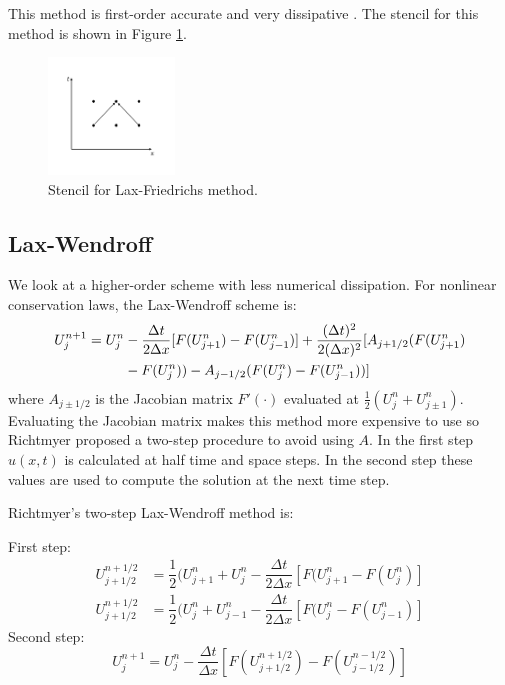 \documentclass[letterpaper]{article}
\newcommand{\Dt}{\Delta t}
\newcommand{\Dx}{\Delta x}
\begin{document}
This method is first-order accurate and very dissipative \cite{LeVequetext}. The stencil for this method is shown in Figure 
\ref{fig:stencil_laxfried}. \\

\begin{figure}[H]
\centering
\includegraphics[trim = 10mm 20mm 10mm 15mm, width=0.3\textwidth]{Laxfried.png}
\caption{Stencil for Lax-Friedrichs method.}
\label{fig:stencil_laxfried}
\end{figure}


\subsection{Lax-Wendroff}
We look at a higher-order scheme with less numerical dissipation. For nonlinear conservation laws, the Lax-Wendroff scheme is: 
\begin{align}
U^{n+1}_j = U^n_j &- \dfrac{\Dt}{2 \Dx}[F(U^n_{j+1}) - F(U^n_{j-1})] + \dfrac{(\Dt)^2}{2 (\Dx)^2}[A_{j+1/2}(F(U^n_{j+1}) \notag \\ 
&- F(U^n_j)) - A_{j-1/2}(F(U^n_j)- F(U^n_{j-1}))]
\end{align}
where $A_{j\pm 1/2}$ is the Jacobian matrix $F'(\cdot)$ evaluated at $\frac{1}{2}(U^n_j + U^n_{j\pm1})$. Evaluating the Jacobian matrix makes this method more expensive to use so Richtmyer proposed a two-step procedure to avoid using $A$. In the first step $u(x,t)$ is calculated at half time and space steps. In the second step these values are used to compute the solution at the next time step. 

Richtmyer's two-step Lax-Wendroff method is: 

First step:
\begin{align}
U^{n+1/2}_{j+1/2} &= \dfrac{1}{2}(U^n_{j+1} + U^n_j - \dfrac{\Dt}{2 \Dx} [F(U^n_{j+1} - F(U^n_j)] \\
U^{n+1/2}_{j+1/2} &= \dfrac{1}{2}(U^n_j + U^n_{j-1} - \dfrac{\Dt}{2 \Dx} [F(U^n_j - F(U^n_{j-1})]
\end{align}
Second step:
\begin{equation}
U^{n+1}_j = U^n_j - \dfrac{\Dt}{\Dx}[F(U^{n+1/2}_{j+1/2}) - F(U^{n-1/2}_{j-1/2})]
\end{equation}
\end{document}
